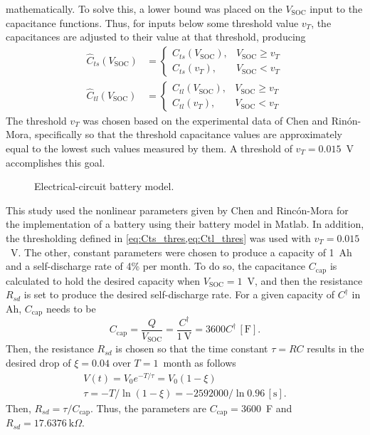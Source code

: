 \documentclass[../zhang_thesis.tex]{subfiles}
\begin{document}
mathematically. To solve this, a lower bound was placed on the $V_\text{SOC}$ input to the capacitance functions. Thus, for inputs below some threshold value $v_T$, the capacitances are adjusted to their value at that threshold, producing
\begin{align}
    \hat{C}_{ts}(V_\text{SOC}) &= \begin{cases}
        C_{ts}(V_\text{SOC}), & V_\text{SOC} \ge v_T \\
        C_{ts}(v_T), & V_\text{SOC} < v_T
        \end{cases} \label{eq:Cts_thres} \\
    \hat{C}_{tl}(V_\text{SOC}) &= \begin{cases}
        C_{tl}(V_\text{SOC}), & V_\text{SOC} \ge v_T \\
        C_{tl}(v_T), & V_\text{SOC} < v_T \label{eq:Ctl_thres}
        \end{cases}
\end{align}
The threshold $v_T$ was chosen based on the experimental data of Chen and Rin\'on-Mora, specifically so that the threshold capacitance values are approximately equal to the lowest such values measured by them. A threshold of $v_T=0.015$~V accomplishes this goal.

\begin{figure}[ht]

\caption{Electrical-circuit battery model.}
\label{fig:batt_model}
\end{figure}

This study used the nonlinear parameters given by Chen and Rinc\'on-Mora for the implementation of a battery using their battery model in Matlab. In addition, the thresholding defined in \cref{eq:Cts_thres,eq:Ctl_thres} was used with $v_T=0.015$~V. The other, constant parameters were chosen to produce a capacity of 1~Ah and a self-discharge rate of 4\% per month. To do so, the capacitance $C_\text{cap}$ is calculated to hold the desired capacity
when $V_\text{SOC}=1$~V, and then the resistance $R_{sd}$ is set to produce the desired self-discharge rate. For a given capacity of $C^\dag$ in Ah, $C_\text{cap}$ needs to be
\begin{equation}
    C_\text{cap} = \frac{Q}{V_\text{SOC}} = \frac{C^\dag}{1~\text{V}} = 3600 C^\dag \,[\text{F}].
\end{equation}
Then, the resistance $R_{sd}$ is chosen so that the time constant $\tau=RC$ results in the desired drop of $\xi=0.04$ over $T=1$~month as follows
\begin{gather}
    V(t) = V_0 e^{-T/\tau} = V_0 (1-\xi) \\
    \tau = -T/\ln(1-\xi) = -2592000/\ln 0.96 \,[\text{s}].
\end{gather}
Then, $R_{sd}=\tau/C_\text{cap}$. Thus, the parameters are $C_\text{cap}=3600$~F and $R_{sd}=17.6376~\mathrm{k}\Omega$.
\end{document}
